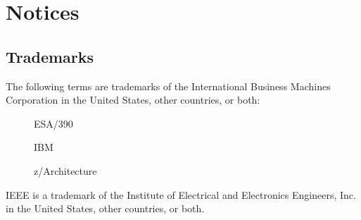 \chapter*{Notices}

\section*{Trademarks}
The following terms are trademarks of the International Business Machines
Corporation in the United States, other countries, or both:

\begin{description}
\item[] ESA/390
\item[] IBM
\item[] z/Architecture
\end{description}

IEEE is a trademark of the Institute of Electrical and Electronics
Engineers, Inc. in the United States, other countries, or both.
